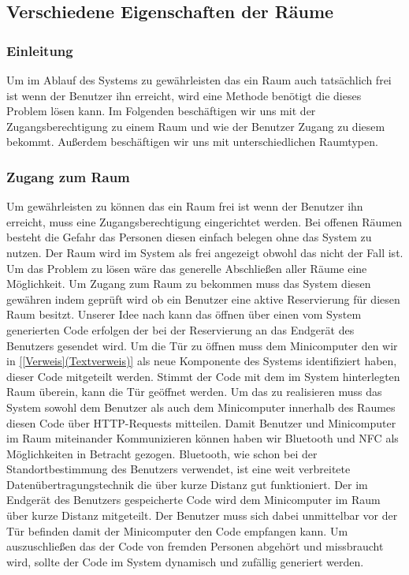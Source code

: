 \subsection{Verschiedene Eigenschaften der Räume}
\label{sec:Verschiedene_Eigenschaften_der-Räume}


\subsubsection{Einleitung}
\label{sec:Verschiedene_Eigenschaften_der_Räume_Einleitung}

Um im Ablauf des Systems zu gewährleisten das ein Raum auch tatsächlich frei
ist wenn der Benutzer ihn erreicht, wird eine Methode benötigt die dieses
Problem lösen kann. Im Folgenden beschäftigen wir uns mit der
Zugangsberechtigung zu einem Raum und wie der Benutzer Zugang zu diesem
bekommt. Außerdem beschäftigen wir uns mit unterschiedlichen Raumtypen. 

\subsubsection{Zugang zum Raum}
\label{sec:Zugang_zum_Raum}

Um gewährleisten zu können das ein Raum frei ist wenn der Benutzer ihn
erreicht, muss eine Zugangsberechtigung eingerichtet werden. Bei offenen
Räumen besteht die Gefahr das Personen diesen einfach belegen ohne das System
zu nutzen. Der Raum wird im System als frei angezeigt obwohl das nicht der Fall
ist. Um das Problem zu lösen wäre das generelle Abschließen aller Räume eine
Möglichkeit. Um Zugang zum Raum zu bekommen muss das System diesen gewähren
indem geprüft wird ob ein Benutzer eine aktive Reservierung für diesen Raum
besitzt. Unserer Idee nach kann das öffnen über einen vom System generierten
Code erfolgen der bei der Reservierung an das Endgerät des Benutzers gesendet
wird. Um die Tür zu öffnen muss \zB dem Minicomputer den wir in \ref{[Verweis](Textverweis)}
als neue Komponente des Systems identifiziert haben, dieser Code mitgeteilt
werden. Stimmt der Code mit dem im System hinterlegten Raum überein, kann die
Tür geöffnet werden. Um das zu realisieren muss das System sowohl dem Benutzer
als auch dem Minicomputer innerhalb des Raumes diesen Code über HTTP-Requests
mitteilen. Damit Benutzer und Minicomputer im Raum miteinander Kommunizieren
können haben wir Bluetooth und NFC als Möglichkeiten in Betracht gezogen.
Bluetooth, wie schon bei der Standortbestimmung des Benutzers verwendet, ist
eine weit verbreitete Datenübertragungstechnik die über kurze Distanz gut
funktioniert. Der im Endgerät des Benutzers gespeicherte Code wird dem
Minicomputer im Raum über kurze Distanz mitgeteilt. Der Benutzer muss sich
dabei unmittelbar vor der Tür befinden damit der Minicomputer den Code empfangen
kann. Um auszuschließen das der Code von fremden Personen abgehört und
missbraucht wird, sollte der Code im System dynamisch und zufällig generiert
werden. 

